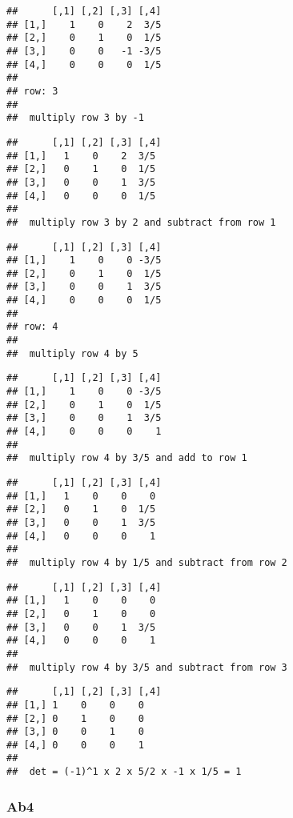 \documentclass[
  10pt,
  a4paper,
]{article}
\begin{document}
\begin{verbatim}
##      [,1] [,2] [,3] [,4]
## [1,]    1    0    2  3/5
## [2,]    0    1    0  1/5
## [3,]    0    0   -1 -3/5
## [4,]    0    0    0  1/5
## 
## row: 3 
## 
##  multiply row 3 by -1
\end{verbatim}

\begin{verbatim}
##      [,1] [,2] [,3] [,4]
## [1,]   1    0    2  3/5 
## [2,]   0    1    0  1/5 
## [3,]   0    0    1  3/5 
## [4,]   0    0    0  1/5 
## 
##  multiply row 3 by 2 and subtract from row 1
\end{verbatim}

\begin{verbatim}
##      [,1] [,2] [,3] [,4]
## [1,]    1    0    0 -3/5
## [2,]    0    1    0  1/5
## [3,]    0    0    1  3/5
## [4,]    0    0    0  1/5
## 
## row: 4 
## 
##  multiply row 4 by 5
\end{verbatim}

\begin{verbatim}
##      [,1] [,2] [,3] [,4]
## [1,]    1    0    0 -3/5
## [2,]    0    1    0  1/5
## [3,]    0    0    1  3/5
## [4,]    0    0    0    1
## 
##  multiply row 4 by 3/5 and add to row 1
\end{verbatim}

\begin{verbatim}
##      [,1] [,2] [,3] [,4]
## [1,]   1    0    0    0 
## [2,]   0    1    0  1/5 
## [3,]   0    0    1  3/5 
## [4,]   0    0    0    1 
## 
##  multiply row 4 by 1/5 and subtract from row 2
\end{verbatim}

\begin{verbatim}
##      [,1] [,2] [,3] [,4]
## [1,]   1    0    0    0 
## [2,]   0    1    0    0 
## [3,]   0    0    1  3/5 
## [4,]   0    0    0    1 
## 
##  multiply row 4 by 3/5 and subtract from row 3
\end{verbatim}

\begin{verbatim}
##      [,1] [,2] [,3] [,4]
## [1,] 1    0    0    0   
## [2,] 0    1    0    0   
## [3,] 0    0    1    0   
## [4,] 0    0    0    1   
## 
##  det = (-1)^1 x 2 x 5/2 x -1 x 1/5 = 1
\end{verbatim}

\hypertarget{ab4}{%
\subsubsection{Ab4}\label{ab4}}
\end{document}
